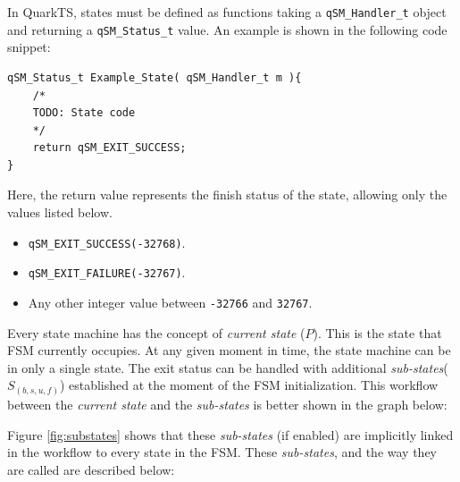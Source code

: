 \documentclass{article}
\begin{document}
In QuarkTS, states must be defined as functions taking a \lstinline{qSM_Handler_t} object and returning a \lstinline{qSM_Status_t} value. An example is shown in the following code snippet:
\newline

\begin{lstlisting}[style=CStyle]
qSM_Status_t Example_State( qSM_Handler_t m ){
    /*
    TODO: State code
    */
    return qSM_EXIT_SUCCESS;
}
\end{lstlisting}    

Here, the return value represents the finish status of the state, allowing only the values listed below.

\begin{itemize}
    \item \lstinline{qSM_EXIT_SUCCESS(-32768)}.
    \item \lstinline{qSM_EXIT_FAILURE(-32767)}.
    \item Any other integer value between \lstinline{-32766} and \lstinline{32767}.
\end{itemize} 

Every state machine has the concept of \textit{current state} ($P$). This is the state that FSM currently occupies. At any given moment in time, the state machine can be in only a single state. The exit status can be handled with additional \textit{sub-states}($S_{(b,s,u,f)}$) established at the moment of the FSM initialization. This workflow between the \textit{current state} and the \textit{sub-states} is better shown in the graph below: 



Figure \ref{fig:substates} shows that these \textit{sub-states} (if enabled) are implicitly linked in the workflow to every state in the FSM. These \textit{sub-states}, and the way they are called are described below:
\end{document}
